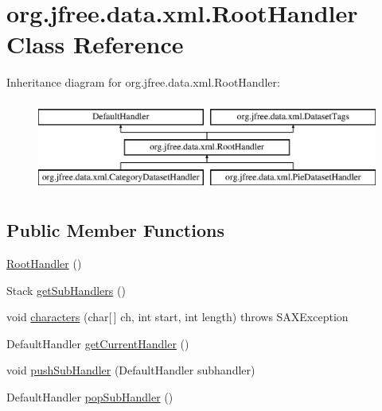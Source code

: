 \hypertarget{classorg_1_1jfree_1_1data_1_1xml_1_1_root_handler}{}\section{org.\+jfree.\+data.\+xml.\+Root\+Handler Class Reference}
\label{classorg_1_1jfree_1_1data_1_1xml_1_1_root_handler}
Inheritance diagram for org.\+jfree.\+data.\+xml.\+Root\+Handler\+:\begin{figure}[H]
\begin{center}
\leavevmode
\includegraphics[height=3.000000cm]{classorg_1_1jfree_1_1data_1_1xml_1_1_root_handler}
\end{center}
\end{figure}
\subsection*{Public Member Functions}
\begin{DoxyCompactItemize}
\item 
\mbox{\hyperlink{classorg_1_1jfree_1_1data_1_1xml_1_1_root_handler_aa69b89ba3c1180322b5ce33c23e64574}{Root\+Handler}} ()
\item 
Stack \mbox{\hyperlink{classorg_1_1jfree_1_1data_1_1xml_1_1_root_handler_a121f0caf0c7fadd0806e9fe0103e7810}{get\+Sub\+Handlers}} ()
\item 
void \mbox{\hyperlink{classorg_1_1jfree_1_1data_1_1xml_1_1_root_handler_a7a853466d5780ea87c1b3316ccddd294}{characters}} (char\mbox{[}$\,$\mbox{]} ch, int start, int length)  throws S\+A\+X\+Exception 
\item 
Default\+Handler \mbox{\hyperlink{classorg_1_1jfree_1_1data_1_1xml_1_1_root_handler_a6c7d1726c1851520d25236abea7f882c}{get\+Current\+Handler}} ()
\item 
void \mbox{\hyperlink{classorg_1_1jfree_1_1data_1_1xml_1_1_root_handler_a757bd4a9107736cd165c5bb5d6988b8a}{push\+Sub\+Handler}} (Default\+Handler subhandler)
\item 
Default\+Handler \mbox{\hyperlink{classorg_1_1jfree_1_1data_1_1xml_1_1_root_handler_af02db13e09000892a1baaa86b16efe79}{pop\+Sub\+Handler}} ()
\end{DoxyCompactItemize}
